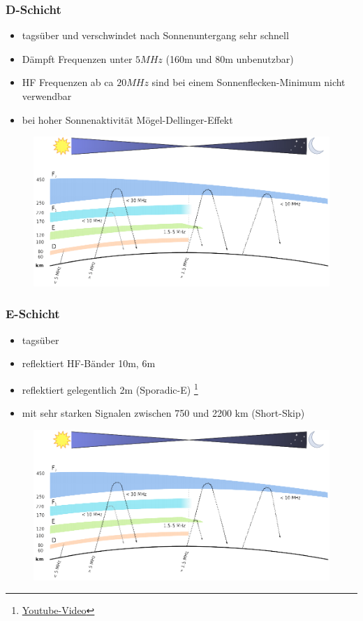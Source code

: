 \begin{frame}
  \frametitle{D-Schicht}
  \begin{itemize}
    \item tagsüber und verschwindet nach Sonnenuntergang sehr schnell
    \item Dämpft Frequenzen unter $5MHz$ (160m und 80m unbenutzbar)
    \item HF Frequenzen ab ca $20MHz$ sind bei einem Sonnenflecken-Minimum nicht verwendbar
    \item bei hoher Sonnenaktivität Mögel-Dellinger-Effekt
  \end{itemize}
  \begin{center}
    \begin{figure}
      \includegraphics[width=.6\textwidth,height=.45\textheight,keepaspectratio]{a08/schichten_behelf_43.png}
    \end{figure}
  \end{center}
\end{frame}

\begin{frame}
  \frametitle{E-Schicht}
  \begin{itemize}
    \item tagsüber
    \item reflektiert HF-Bänder 10m, 6m
    \item reflektiert gelegentlich 2m (Sporadic-E) \footnote{\tiny \href{https://www.youtube.com/watch?v=xSWTkuSekhE}{\ExternalLink Youtube-Video}}
    \item mit sehr starken Signalen zwischen 750 und 2200 km (Short-Skip)
  \end{itemize}
  \begin{center}
    \begin{figure}
      \includegraphics[width=.75\textwidth,height=.4\textheight,keepaspectratio]{a08/schichten_behelf_43.png}
    \end{figure}
  \end{center}
\end{frame}

